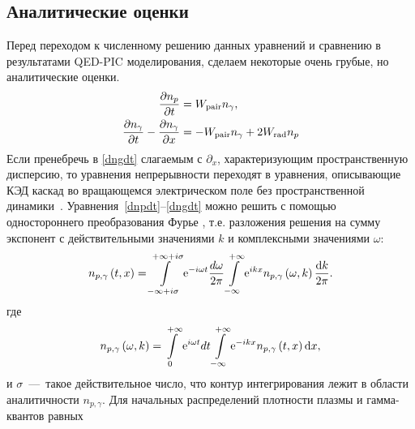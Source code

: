 \subsection{Аналитические оценки}
\label{sub:ch2/sec3/analytics}
Перед переходом к численному решению данных уравнений и сравнению в результатами QED-PIC моделирования, сделаем некоторые очень грубые, но аналитические оценки.
\begin{align}
	\label{dnpdt}
    \pdv{n_{p}}{ t}  & =    W_\mathrm{pair}n_{\gamma}, \\
	\label{dngdt}   
    \pdv{ n_{\gamma}}{ t}-\pdv{ n_{\gamma}}{ x} &  =   -W_\mathrm{pair}n_{\gamma}+2W_\mathrm{rad}n_{p}
\end{align}
Если пренебречь в \eqref{dngdt} слагаемым с $\partial_x$, характеризующим пространственную дисперсию, то уравнения непрерывности переходят в уравнения, описывающие КЭД каскад во вращающемся электрическом поле без пространственной динамики~\cite{bashmakov2014effect,grismayer2017seeded}.
Уравнения~\eqref{dnpdt}--\eqref{dngdt} можно решить с помощью одностороннего преобразования Фурье \cite{LL10}, т.е. разложения решения на сумму экспонент с действительными значениями $k$ и комплексными значениями $\omega$:
\begin{equation}
    \label{t-x}
    n_{p,\gamma}\left(t,x\right) = \intop_{-\infty+i\sigma}^{+\infty+i\sigma}\mathrm{e}^{-i\omega t}\frac{d\omega}{2\pi}\intop_{-\infty}^{+\infty}\mathrm{e}^{ikx}n_{p,\gamma}\left(\omega,k\right)\frac{\dd k}{2\pi}.
\end{equation}
где
\begin{equation}
    \label{w-k}
n_{p,\gamma}\left(\omega,k\right) = \intop_{0}^{+\infty}\mathrm{e}^{i\omega t}dt\intop_{-\infty}^{+\infty}\mathrm{e}^{-ikx}n_{p,\gamma}\left(t,x\right)\dd x,
\end{equation}
и $\sigma$~---~такое действительное число, что контур интегрирования лежит в области аналитичности $n_{p,\gamma}$. 
Для начальных распределений плотности плазмы и гамма-квантов равных 
